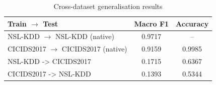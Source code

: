 \begin{table}[h]
\centering
\caption{Cross-dataset generalisation results}
\label{tab:cross_dataset}
\begin{tabular}{lcc}
\hline
\textbf{Train} $\rightarrow$ \textbf{Test} & \textbf{Macro F1} & \textbf{Accuracy} \\
\hline
NSL-KDD $\rightarrow$ NSL-KDD (native) & 0.9717 & -- \\
CICIDS2017 $\rightarrow$ CICIDS2017 (native) & 0.9159 & 0.9985 \\
NSL-KDD -> CICIDS2017 & 0.1715 & 0.6367 \\
CICIDS2017 -> NSL-KDD & 0.1393 & 0.5344 \\
\hline
\end{tabular}
\end{table}